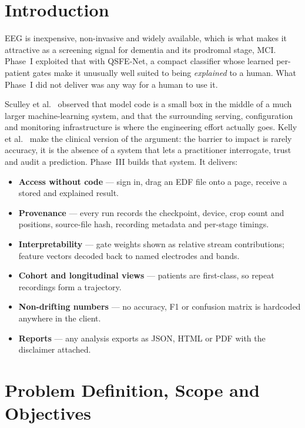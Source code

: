 \documentclass[11pt,a4paper]{article}
\begin{document}
\clearpage
{}

\section{Introduction}

EEG is inexpensive, non-invasive and widely available, which is what makes it
attractive as a screening signal for dementia and its prodromal stage, MCI.
Phase~I exploited that with QSFE-Net, a compact classifier whose learned
per-patient gates make it unusually well suited to being \emph{explained} to a
human. What Phase~I did not deliver was any way for a human to use it.

Sculley et al.~\cite{sculley2015} observed that model code is a small box in the
middle of a much larger machine-learning system, and that the surrounding
serving, configuration and monitoring infrastructure is where the engineering
effort actually goes. Kelly et al.~\cite{kelly2019} make the clinical version of
the argument: the barrier to impact is rarely accuracy, it is the absence of a
system that lets a practitioner interrogate, trust and audit a prediction.
Phase~III builds that system. It delivers:

\begin{itemize}
\item \textbf{Access without code} --- sign in, drag an EDF file onto a page,
      receive a stored and explained result.
\item \textbf{Provenance} --- every run records the checkpoint, device, crop
      count and positions, source-file hash, recording metadata and per-stage
      timings.
\item \textbf{Interpretability} --- gate weights shown as relative stream
      contributions; feature vectors decoded back to named electrodes and bands.
\item \textbf{Cohort and longitudinal views} --- patients are first-class, so
      repeat recordings form a trajectory.
\item \textbf{Non-drifting numbers} --- no accuracy, F1 or confusion matrix is
      hardcoded anywhere in the client.
\item \textbf{Reports} --- any analysis exports as JSON, HTML or PDF with the
      disclaimer attached.
\end{itemize}

\section{Problem Definition, Scope and Objectives}
\end{document}
